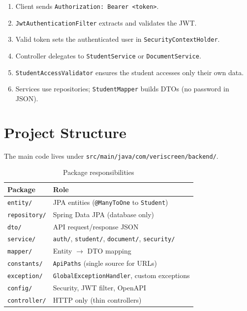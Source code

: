 \documentclass[11pt,a4paper]{article}
\begin{document}
\begin{enumerate}[noitemsep]
    \item Client sends \texttt{Authorization: Bearer <token>}.
    \item \texttt{JwtAuthenticationFilter} extracts and validates the JWT.
    \item Valid token sets the authenticated user in \texttt{SecurityContextHolder}.
    \item Controller delegates to \texttt{StudentService} or \texttt{DocumentService}.
    \item \texttt{StudentAccessValidator} ensures the student accesses only their own data.
    \item Services use repositories; \texttt{StudentMapper} builds DTOs (no password in JSON).
\end{enumerate}

\section{Project Structure}

The main code lives under \texttt{src/main/java/com/veriscreen/backend/}.

\begin{table}[h]
\centering
\begin{tabular}{@{}lp{9cm}@{}}
\toprule
\textbf{Package} & \textbf{Role} \\
\midrule
\texttt{entity/}       & JPA entities (\texttt{@ManyToOne} to \texttt{Student}) \\
\texttt{repository/}  & Spring Data JPA (database only) \\
\texttt{dto/}          & API request/response JSON \\
\texttt{service/}      & \texttt{auth/}, \texttt{student/}, \texttt{document/}, \texttt{security/} \\
\texttt{mapper/}       & Entity $\rightarrow$ DTO mapping \\
\texttt{constants/}    & \texttt{ApiPaths} (single source for URLs) \\
\texttt{exception/}    & \texttt{GlobalExceptionHandler}, custom exceptions \\
\texttt{config/}       & Security, JWT filter, OpenAPI \\
\texttt{controller/}   & HTTP only (thin controllers) \\
\bottomrule
\end{tabular}
\caption{Package responsibilities}
\end{table}
\end{document}

